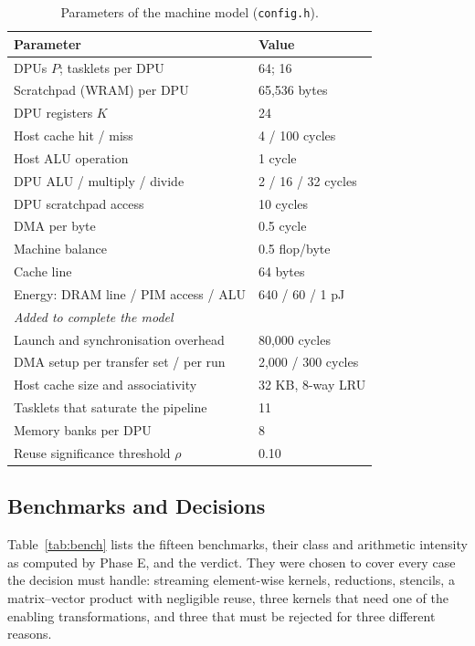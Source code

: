 \documentclass{ieeeaccess}
\begin{document}
\begin{table}[!t]
\caption{Parameters of the machine model (\texttt{config.h}).}
\label{tab:params}
\setlength{\tabcolsep}{3pt}
\renewcommand{\arraystretch}{1.1}
\centering
\begin{tabular}{|p{4.6cm}|p{2.9cm}|}
\hline
\textbf{Parameter} & \textbf{Value} \\ \hline
DPUs $P$; tasklets per DPU & 64; 16 \\ \hline
Scratchpad (WRAM) per DPU & 65,536 bytes \\ \hline
DPU registers $K$ & 24 \\ \hline
Host cache hit / miss & 4 / 100 cycles \\ \hline
Host ALU operation & 1 cycle \\ \hline
DPU ALU / multiply / divide & 2 / 16 / 32 cycles \\ \hline
DPU scratchpad access & 10 cycles \\ \hline
DMA per byte & 0.5 cycle \\ \hline
Machine balance & 0.5 flop/byte \\ \hline
Cache line & 64 bytes \\ \hline
Energy: DRAM line / PIM access / ALU & 640 / 60 / 1 pJ \\ \hline
\multicolumn{2}{|l|}{\emph{Added to complete the model}} \\ \hline
Launch and synchronisation overhead & 80,000 cycles \\ \hline
DMA setup per transfer set / per run & 2,000 / 300 cycles \\ \hline
Host cache size and associativity & 32 KB, 8-way LRU \\ \hline
Tasklets that saturate the pipeline & 11 \\ \hline
Memory banks per DPU & 8 \\ \hline
Reuse significance threshold $\rho$ & 0.10 \\ \hline
\end{tabular}
\end{table}

\subsection{Benchmarks and Decisions}
Table~\ref{tab:bench} lists the fifteen benchmarks, their class and arithmetic intensity as computed by Phase E, and the verdict. They were chosen to cover every case the decision must handle: streaming element-wise kernels, reductions, stencils, a matrix--vector product with negligible reuse, three kernels that need one of the enabling transformations, and three that must be rejected for three different reasons.
\end{document}
